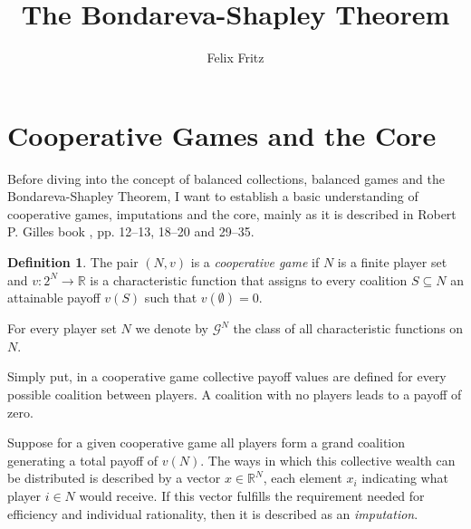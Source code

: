\documentclass[10pt,a4paper,titlepage]{article}
\author{Felix Fritz}
\title{The Bondareva-Shapley Theorem}
\theoremstyle{plain}
\theoremstyle{definition}
\newtheorem{definition}[thm]{Definition} %
\begin{document}
\maketitle

\tableofcontents
\pagebreak

\section{Cooperative Games and the Core}
Before diving into the concept of balanced collections, balanced games and the Bondareva-Shapley Theorem, I want to establish a basic understanding of cooperative games, imputations and the core, mainly as it is described in Robert P. Gilles book \cite{gilles}, pp. 12--13, 18--20 and 29--35.

\begin{definition}
    The pair $(N, v)$ is a \textit{cooperative game} if $N$ is a finite player set and $v: 2^N \rightarrow \mathbb{R}$ is a characteristic function that assigns to every coalition $S \subseteq N$ an attainable payoff $v(S)$ such that $v(\emptyset) = 0$.
    
    For every player set $N$ we denote by $\mathcal{G}^N$ the class of all characteristic functions on $N$.
\end{definition}
Simply put, in a cooperative game collective payoff values are defined for every possible coalition between players. A coalition with no players leads to a payoff of zero.

Suppose for a given cooperative game all players form a grand coalition generating a total payoff of $v(N)$. The ways in which this collective wealth can be distributed is described by a vector $x \in \mathbb{R}^N$, each element $x_i$ indicating what player $i \in N$ would receive.
If this vector fulfills the requirement needed for efficiency and individual rationality, then it is described as an \textit{imputation}.
\end{document}
